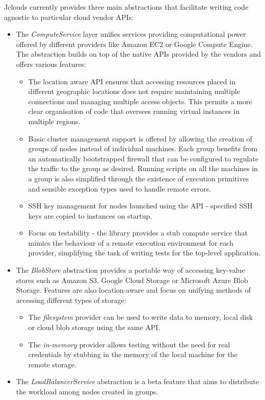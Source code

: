 Jclouds currently provides three main abstractions that facilitate writing code agnostic to particular cloud vendor APIs:
\begin{itemize}
	\item The \textit{ComputeService} layer unifies services providing computational power offered by different providers like Amazon EC2 or Google Compute Engine. The abstraction builds on top of the native APIs provided by the vendors and offers various features:
	\begin{itemize}
		\item The location aware API ensures that accessing resources placed in different geographic locations does not require maintaining multiple connections and managing multiple access objects. This permits a more clear organisation of code that oversees running virtual instances in multiple regions.
		\item Basic cluster management support is offered by allowing the creation of groups of nodes instead of individual machines. Each group benefits from an automatically bootstrapped firewall that can be configured to regulate the traffic to the group as desired. Running scripts on all the machines in a group is also simplified through the existence of execution primitives and sensible exception types used to handle remote errors.
		\item SSH key management for nodes launched using the API - specified SSH keys are copied to instances on startup.
		\item Focus on testability - the library provides a stub compute service that mimics the behaviour of a remote execution environment for each provider, simplifying the task of writing tests for the top-level application.
	\end{itemize}
	\item The \textit{BlobStore} abstraction provides a portable way of accessing key-value stores such as Amazon S3, Google Cloud Storage or Microsoft Azure Blob Storage. Features are also location-aware and focus on unifying methods of accessing different types of storage:
	\begin{itemize}
		\item The \textit{filesystem} provider can be used to write data to memory, local disk or cloud blob storage using the same API.
		\item The \textit{in-memory} provider allows testing without the need for real credentials by stubbing in the memory of the local machine for the remote storage.
	\end{itemize}
	\item The \textit{LoadBalancerService} abstraction is a beta feature that aims to distribute the workload among nodes created in groups.
\end{itemize}

